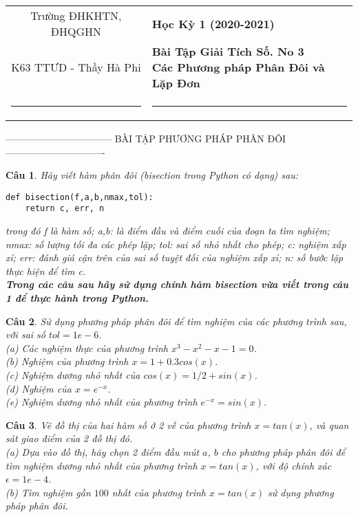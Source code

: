 \documentclass[11pt]{article}
\newtheorem{bt}{Câu}
\begin{document}
\begin{tabular*}
{\linewidth}{c>{\centering\hspace{0pt}} p{}}
Trường ĐHKHTN, ĐHQGHN & {\bf Học Kỳ 1 (2020-2021)}
\tabularnewline
K63 TTƯD - Thầy Hà Phi & {\bf Bài Tập Giải Tích Số. No 3 \\ Các Phương pháp Phân Đôi và Lặp Đơn}
\tabularnewline
\rule{1in}{1pt}  \small  & \rule{2in}{1pt} %
\tabularnewline

\end{tabular*}
%

\centerline{——————————— BÀI TẬP PHƯƠNG PHÁP PHÂN ĐÔI ——————————-}

\begin{bt}
	Hãy viết hàm phân đôi (bisection trong Python có dạng) sau:
	\begin{lstlisting}[frame=single] 
	def bisection(f,a,b,nmax,tol):
	return c, err, n
	\end{lstlisting}
	trong đó f là hàm số; a,b: là điểm đầu và điểm cuối của đoạn ta tìm nghiệm; nmax: số lượng tối đa các phép lặp; tol: sai số nhỏ nhất cho phép; c: nghiệm xấp xỉ;
	err: đánh giá cận trên của sai số tuyệt đối của nghiệm xấp xỉ; n: số bước lặp thực hiện để tìm c.\\
	\textbf{Trong các câu sau hãy sử dụng chính hàm bisection vừa viết trong câu 1 để thực hành trong Python.}
\end{bt}

\begin{bt} 
	Sử dụng phương pháp phân đôi để tìm nghiệm của các phương trình sau, với sai số $tol=1e-6$.\\ 
	(a) Các nghiệm thực của phương trình $x^3 - x^2 - x - 1 = 0$. \\
	(b) Nghiệm của phương trình $x = 1 + 0.3 cos(x)$. \\
	(c) Nghiệm dương nhỏ nhất của $cos(x) = 1/2 + sin (x)$. \\
	(d) Nghiệm của $x = e^{-x}$. \\
	(e) Nghiệm dương nhỏ nhất của phương trình $e^{-x} = sin(x)$. 
\end{bt}

\begin{bt}
	Vẽ đồ thị của hai hàm số ở 2 vế của phương trình $x = tan(x)$, và quan sát giao điểm của 2 đồ thị đó.\\
	(a) Dựa vào đồ thị, hãy chọn 2 điểm đầu mút $a$, $b$ cho phương pháp phân đôi để tìm nghiệm dương nhỏ nhất của phương trình $x = tan (x)$, với độ chính xác 
	$\epsilon=1e-4$. \\
	(b) Tìm nghiệm gần $100$ nhất của phương trình $x = tan(x)$ sử dụng phương pháp phân đôi.
\end{bt}
\end{document}
